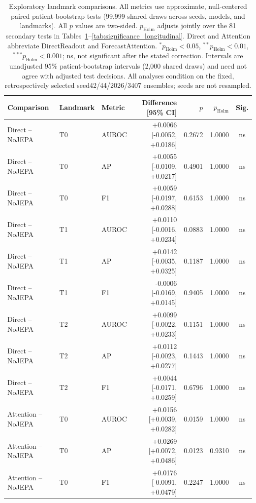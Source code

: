 \begin{table}[t]
\centering
\small
\caption{Exploratory landmark comparisons. All metrics use approximate, null-centered paired patient-bootstrap tests (99,999 shared draws across seeds, models, and landmarks). All $p$ values are two-sided. $p_{\mathrm{Holm}}$ adjusts jointly over the 81 secondary tests in Tables~\ref{tab:significance_landmarks}--\ref{tab:significance_longitudinal}. Direct and Attention abbreviate DirectReadout and ForecastAttention. $^{*}p_{\mathrm{Holm}}<0.05$, $^{**}p_{\mathrm{Holm}}<0.01$, $^{***}p_{\mathrm{Holm}}<0.001$; ns, not significant after the stated correction. Intervals are unadjusted 95\% patient-bootstrap intervals (2,000 shared draws) and need not agree with adjusted test decisions. All analyses condition on the fixed, retrospectively selected seed42/44/2026/3407 ensembles; seeds are not resampled.}
\label{tab:significance_landmarks}
\begin{tabular}{lllrrrc}
\toprule
Comparison & Landmark & Metric & Difference [95\% CI] & $p$ & $p_{\mathrm{Holm}}$ & Sig. \\
\midrule
Direct -- NoJEPA & T0 & AUROC & +0.0066 [-0.0052, +0.0186] & 0.2672 & 1.0000 & ns \\
Direct -- NoJEPA & T0 & AP & +0.0055 [-0.0109, +0.0217] & 0.4901 & 1.0000 & ns \\
Direct -- NoJEPA & T0 & F1 & +0.0059 [-0.0197, +0.0288] & 0.6153 & 1.0000 & ns \\
Direct -- NoJEPA & T1 & AUROC & +0.0110 [-0.0016, +0.0234] & 0.0883 & 1.0000 & ns \\
Direct -- NoJEPA & T1 & AP & +0.0142 [-0.0035, +0.0325] & 0.1187 & 1.0000 & ns \\
Direct -- NoJEPA & T1 & F1 & -0.0006 [-0.0169, +0.0145] & 0.9405 & 1.0000 & ns \\
Direct -- NoJEPA & T2 & AUROC & +0.0099 [-0.0022, +0.0233] & 0.1151 & 1.0000 & ns \\
Direct -- NoJEPA & T2 & AP & +0.0112 [-0.0023, +0.0277] & 0.1443 & 1.0000 & ns \\
Direct -- NoJEPA & T2 & F1 & +0.0044 [-0.0171, +0.0259] & 0.6796 & 1.0000 & ns \\
Attention -- NoJEPA & T0 & AUROC & +0.0156 [+0.0039, +0.0282] & 0.0159 & 1.0000 & ns \\
Attention -- NoJEPA & T0 & AP & +0.0269 [+0.0072, +0.0486] & 0.0123 & 0.9310 & ns \\
Attention -- NoJEPA & T0 & F1 & +0.0176 [-0.0091, +0.0479] & 0.2247 & 1.0000 & ns \\

\end{tabular}
\end{table}
